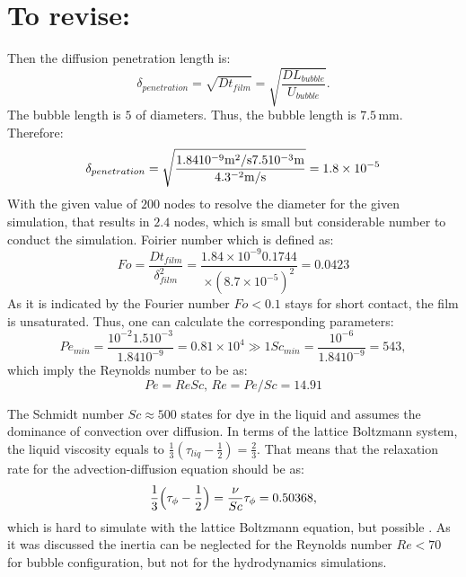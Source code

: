 \documentclass{article}
\begin{document}
\section{To revise:}
Then the diffusion penetration length is:
\begin{equation}
\delta_{penetration}=\sqrt{D t_{film}}=\sqrt{\frac{D L_{bubble}}{U_{bubble}}}.
\end{equation}
The bubble length is $5$ of diameters. Thus, the bubble length is $7.5\,\mathrm{mm}$. Therefore:
\begin{equation}
\delta_{penetration}=\sqrt{\frac{1.84 10^{-9} \mathrm{m^2/s} 7.5 10^{-3} \mathrm{m}}{4.3 \time
10^{-2}\mathrm{m/s}}}=1.8 \times 10^{-5}
\end{equation}
With the given value of $200$ nodes to resolve the diameter for the given simulation, that results
in $2.4$ nodes, which is small but considerable number to conduct the simulation.
Foirier number which is defined as:
\begin{equation}
Fo=\frac{D t_{film}}{\delta_{film}^2}=\frac{1.84\times 10^{-9} 0.1744}{\times
(8.7\times10^{-5})^2}=0.0423
\end{equation}
As it is indicated by \citet{vanbaten-circular} the Fourier number $Fo<0.1$ stays for short
contact, the film is unsaturated. 
Thus, one can calculate the corresponding parameters:
\begin{equation}
Pe_{min}=\frac{10^{-2} 1.5 10^{-3}}{1.84  10^{-9}}=0.81 \times 10^{4}\gg 1
Sc_{min}=\frac{10^{-6}}{1.84 10^{-9}}=543,
\end{equation}
which imply the Reynolds number to be as:
\begin{equation}
Pe=Re Sc,\,Re=Pe/Sc=14.91
\end{equation}

The Schmidt number $Sc \approx 500$ states for dye in the liquid and assumes the dominance of
convection over diffusion. In terms of the lattice Boltzmann system, the liquid viscosity equals to
$\frac{1}{3}(\tau_{liq}-\frac{1}{2})=\frac{2}{3}$. That means that the relaxation rate for the
advection-diffusion equation should be as:
\begin{equation}
\frac{1}{3}\Bigl(\tau_{\phi}-\frac{1}{2}\Bigr)=\frac{\nu}{Sc}\\
\tau_{\phi}=0.50368,
\end{equation}
which is hard to simulate with the lattice Boltzmann equation, but possible . As it was discussed
\cite{giavedoni-numerical} the inertia can be neglected for the Reynolds number $Re<70$ for bubble
configuration, but not for the hydrodynamics simulations.
\end{document}
